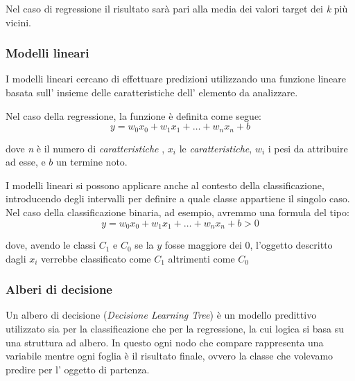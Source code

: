 \documentclass[a4paper,12pt]{report}
\begin{document}
Nel caso di regressione il risultato sarà pari alla media dei valori target dei \textit{k} più vicini.


\subsubsection{Modelli lineari}
I modelli lineari cercano di effettuare predizioni utilizzando una funzione lineare basata sull' insieme delle caratteristiche dell' elemento da analizzare.

Nel caso della regressione, la funzione è definita come segue: 
\begin{equation*}
    y  = w_0x_0 + w_1x_1 + \dots + w_nx_n + b
\end{equation*}

dove \textit{n} è il numero di \textit{caratteristiche} , $x_i$ le \textit{caratteristiche}, $w_i$ i pesi da attribuire ad esse, e $b$ un termine noto.

\bigskip

I modelli lineari si possono applicare anche al contesto della classificazione, introducendo degli intervalli per definire a quale classe appartiene il singolo caso. Nel caso della classificazione binaria, ad esempio, avremmo una formula del tipo:
\begin{equation*}
    y = w_0x_0 + w_1x_1 + \dots + w_nx_n + b > 0
\end{equation*}

dove, avendo le classi $C_1$ e $C_0$ se la $y$ fosse maggiore dei 0, l'oggetto descritto dagli $x_i$ verrebbe classificato come $C_1$ altrimenti come $C_0$


\subsubsection{Alberi di decisione}


Un albero di decisione (\textit{Decisione Learning Tree}) è un modello predittivo   utilizzato sia per la classificazione che per la regressione, la cui logica si basa su una struttura ad albero. In questo ogni nodo che compare rappresenta una variabile mentre ogni foglia è il risultato finale, ovvero la classe che volevamo predire per l' oggetto di partenza.

\end{document}
